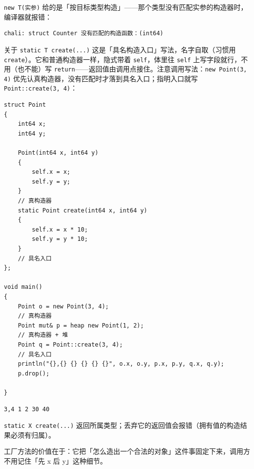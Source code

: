 \texttt{new T(\allowbreak{}实参)\allowbreak{}} 给的是「按目标类型构造」——那个类型没有匹配实参的构造器时，编译器就报错：

\par
\medskip
\begin{lstlisting}[style=out]
chali: struct Counter 没有匹配的构造函数：(int64)
\end{lstlisting}
\par
\medskip

\begin{tip}{关于 \texttt{static T create(\allowbreak{}.\allowbreak{}.\allowbreak{}.\allowbreak{})\allowbreak{}}}
这是「具名构造入口」写法，名字自取（习惯用 \texttt{create}）。它和普通构造器一样，隐式带着 \texttt{self}，体里往 \texttt{self} 上写字段就行，不用（也不能）写 \texttt{return}——返回值由调用点接住。注意调用写法：\texttt{new Point(\allowbreak{}3,\allowbreak{} 4)\allowbreak{}} 优先认真构造器，没有匹配时才落到具名入口；指明入口就写 \texttt{Point:\allowbreak{}:\allowbreak{}create(\allowbreak{}3,\allowbreak{} 4)\allowbreak{}}：
\end{tip}

\par
\medskip
\begin{lstlisting}[style=chali]
struct Point
{
    int64 x;
    int64 y;

    Point(int64 x, int64 y)
    {
        self.x = x;
        self.y = y;
    }
    // 真构造器
    static Point create(int64 x, int64 y)
    {
        self.x = x * 10;
        self.y = y * 10;
    }
    // 具名入口
};

void main()
{
    Point o = new Point(3, 4);
    // 真构造器
    Point mut& p = heap new Point(1, 2);
    // 真构造器 + 堆
    Point q = Point::create(3, 4);
    // 具名入口
    println("{},{} {} {} {} {}", o.x, o.y, p.x, p.y, q.x, q.y);
    p.drop();

}
\end{lstlisting}
\par
\medskip

\par
\medskip
\begin{lstlisting}[style=out]
3,4 1 2 30 40
\end{lstlisting}
\par
\medskip

\texttt{static X create(\allowbreak{}.\allowbreak{}.\allowbreak{}.\allowbreak{})\allowbreak{}} 返回所属类型；丢弃它的返回值会报错（拥有值的构造结果必须有归属）。

工厂方法的价值在于：它把「怎么造出一个合法的对象」这件事固定下来，调用方不用记住「先 x 后 y」这种细节。

